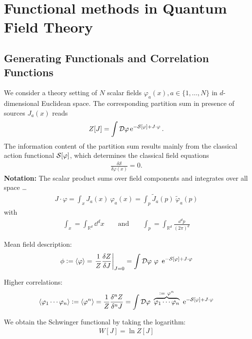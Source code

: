 \chapter{Functional methods in Quantum Field Theory}
\blindtext
\section{Generating Functionals and Correlation Functions}
We consider a theory setting of $N$ scalar fields $\varphi_a(x), a \in \{1,\dots,N\}$ in $d$-dimensional Euclidean space. The corresponding partition sum in presence of sources $J_a(x)$ reads
\begin{align}
	Z[J] =  \int \D\varphi \operatorname{e}^{-\S + J\cdot\varphi}.
\end{align}
The information content of the partition sum results mainly from the classical action functional $\S$, which determines the classical field equations
\begin{align}
	\frac{\delta \mathcal{S}}{\delta\varphi(x)} = 0.
\end{align}
\textbf{Notation:} The scalar product sums over field components and integrates over all space \dots
\begin{align}
	J\cdot\varphi = \int_x J_a(x) \ \varphi_a(x) = \int_p \tilde{J}_a(p) \ \tilde{\varphi}_a(p)
\end{align}
with
\begin{align}
\int_x = \int_{\mathbb{R}^d} \dd^d x \qquad \text{and} \qquad \int_p = \int_{\mathbb{R}^d} \frac{\dd^d p}{(2\pi)^d}	
\end{align}

Mean field description:
\begin{align}
	\phi := \cf{\varphi} = \eval{\frac{1}{Z}\frac{\delta Z}{\delta J}}_{J=0} = \int \D\varphi \ \varphi \ \operatorname{e}^{-\S + J\cdot\varphi}  
\end{align}

Higher correlations:
\begin{align}
\cf{\varphi_1 \cdots \varphi_n} := \cf{\varphi^n} = \frac{1}{Z}\frac{\delta^n Z}{\delta^n J} = \int \D\varphi \ \overbrace{\varphi_1 \cdots \varphi_n}^{:= \ \varphi^n} \ \operatorname{e}^{-\S + J\cdot\varphi}  
\end{align}

We obtain the Schwinger functional by taking the logarithm:
\begin{align}
	W[J] = \ln Z[J]
\end{align}

